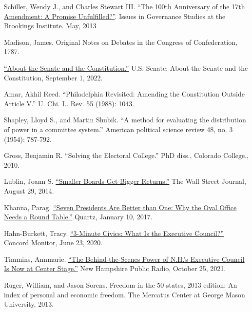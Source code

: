 \documentclass{article}
\newcommand{\quotes}[1]{``#1''}
\begin{document}
\begin{thebibliography}{20}
Schiller, Wendy J., and Charles Stewart III. \href{https://www.brookings.edu/wp-content/uploads/2016/06/Schiller_17th-Amendment_v7.pdf}{\quotes{The 100th Anniversary of the 17th Amendment: A Promise Unfulfilled?}}. Issues in Governance Studies at the Brookings Institute. May, 2013

Madison, James. Original Notes on Debates in the Congress of Confederation, 1787.

\href{https://www.senate.gov/about/origins-foundations/senate-and-constitution.htm}{\quotes{About the Senate and the Constitution.}} U.S. Senate: About the Senate and the Constitution, September 1, 2022.

Amar, Akhil Reed. \quotes{Philadelphia Revisited: Amending the Constitution Outside Article V.} U. Chi. L. Rev. 55 (1988): 1043.

Shapley, Lloyd S., and Martin Shubik. \quotes{A method for evaluating the distribution of power in a committee system.} American political science review 48, no. 3 (1954): 787-792.

Gross, Benjamin R. \quotes{Solving the Electoral College.} PhD diss., Colorado College., 2010.

Lublin, Joann S. \href{https://www.wsj.com/articles/smaller-boards-get-bigger-returns-1409078628}{\quotes{Smaller Boards Get Bigger Returns.}} The Wall Street Journal, August 29, 2014. 

Khanna, Parag. \href{https://qz.com/876260/seven-presidents-are-better-than-one-why-the-oval-office-needs-a-round-table}{\quotes{Seven Presidents Are Better than One: Why the Oval Office Needs a Round Table.}} Quartz, January 10, 2017.

Hahn-Burkett, Tracy. \href{https://www.concordmonitor.com/What-is-the-Executive-Council-34817477}{\quotes{3-Minute Civics: What Is the Executive Council?}} Concord Monitor, June 23, 2020.

Timmins, Annmarie. \href{https://www.nhpr.org/nh-news/2021-10-25/executive-council}{\quotes{The Behind-the-Scenes Power of N.H.’s Executive Council Is Now at Center Stage.}} New Hampshire Public Radio, October 25, 2021. 

Ruger, William, and Jason Sorens. Freedom in the 50 states, 2013 edition: An index of personal and economic freedom. The Mercatus Center at George Mason University, 2013.


\end{thebibliography}
\end{document}
